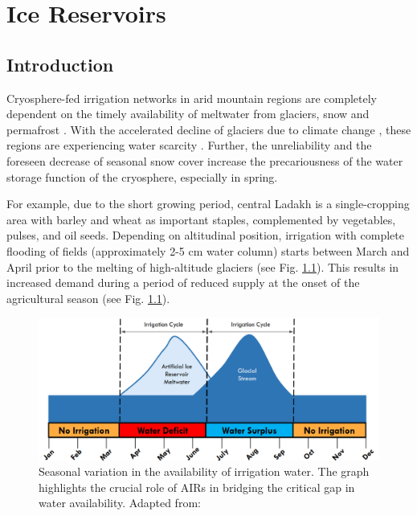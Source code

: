 \chapter{Ice Reservoirs}


\section{Introduction}

Cryosphere-fed irrigation networks in arid mountain regions are completely dependent on the timely availability
of meltwater from glaciers, snow and permafrost \citep{immerzeelImportanceVulnerabilityWorld2020,
farhanHydrologicalRegimesConjunction2015, tveitenGlacierGrowingLocal2007}. With the accelerated decline of
glaciers due to climate change \citep{nusserLocalKnowledgeGlobal2016}, these regions are experiencing water
scarcity \citep{norphelSnowWaterHarvesting2015, mukhopadhyayReevaluationSnowmeltGlacial2015}. Further, the
unreliability and the foreseen decrease of seasonal snow cover \citep{chevuturiClimateChangeLeh2018} increase
the precariousness of the water storage function of the cryosphere, especially in spring.

For example, due to the short growing period, central Ladakh is a single-cropping area with barley and wheat as
important staples, complemented by vegetables, pulses, and oil seeds. Depending on altitudinal position,
irrigation with complete flooding of fields (approximately 2-5 cm water column) starts between March and April
prior to the melting of high-altitude glaciers \citep{nusserSociohydrologyArtificialGlaciers2019} (see Fig.
\ref{fig:irrigation_cycles}). This results in increased demand during a period of reduced supply at the onset of
the agricultural season (see Fig. \ref{fig:irrigation_cycles}).

\begin{figure}[htb]
\centering
\includegraphics[width=12cm]{figs/irrigation_cycles.png}
\caption{Seasonal variation in the availability of irrigation water. The graph highlights the crucial role of
AIRs in bridging the critical gap in water availability. Adapted from: \cite{nusserLocalKnowledgeGlobal2016}}
\label{fig:irrigation_cycles}
\end{figure}

